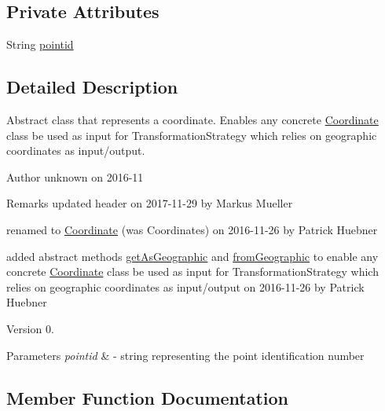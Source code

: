 \subsection*{Private Attributes}
\begin{DoxyCompactItemize}
\item 
String \hyperlink{classcoordinates_1_1_coordinate_a871c4eb3e8771b3e59f26c8e573d6aa0}{pointid}
\end{DoxyCompactItemize}


\subsection{Detailed Description}
Abstract class that represents a coordinate. Enables any concrete \hyperlink{classcoordinates_1_1_coordinate}{Coordinate} class be used as input for Transformation\+Strategy which relies on geographic coordinates as input/output. 

\begin{DoxyAuthor}{Author}
unknown on 2016-\/11 
\end{DoxyAuthor}
\begin{DoxyRemark}{Remarks}
updated header on 2017-\/11-\/29 by Markus Mueller 

renamed to \hyperlink{classcoordinates_1_1_coordinate}{Coordinate} (was Coordinates) on 2016-\/11-\/26 by Patrick Huebner 

added abstract methods \hyperlink{classcoordinates_1_1_coordinate_a97342479914743d999cef4b38f9124ed}{get\+As\+Geographic} and \hyperlink{classcoordinates_1_1_coordinate_a7307326f53867082a66d1f96cfb1d7d0}{from\+Geographic} to enable any concrete \hyperlink{classcoordinates_1_1_coordinate}{Coordinate} class be used as input for Transformation\+Strategy which relies on geographic coordinates as input/output on 2016-\/11-\/26 by Patrick Huebner 
\end{DoxyRemark}
\begin{DoxyVersion}{Version}
0. 
\end{DoxyVersion}

\begin{DoxyParams}{Parameters}
{\em pointid} & -\/ string representing the point identification number \\
\hline
\end{DoxyParams}


\subsection{Member Function Documentation}
\mbox{\label{classcoordinates_1_1_coordinate_a7307326f53867082a66d1f96cfb1d7d0}} 
